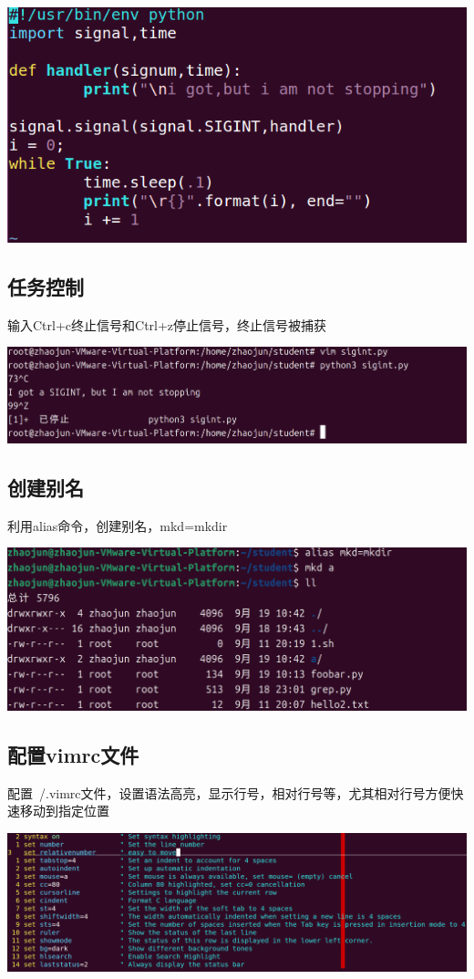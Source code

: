 \documentclass[UTF8,a4paper]{ctexart}
\begin{document}
\begin{sloppypar}
	
	\includegraphics[width = 16cm]{1}
	
	\subsection{任务控制}
	输入Ctrl+c终止信号和Ctrl+z停止信号，终止信号被捕获
	
	\includegraphics[width = 16cm]{2}
	
	\subsection{创建别名}
	利用alias命令，创建别名，mkd=mkdir
	
	\includegraphics[width = 16cm]{3}
	
	\subsection{配置vimrc文件}
	配置~/.vimrc文件，设置语法高亮，显示行号，相对行号等，尤其相对行号方便快速移动到指定位置
	
	\includegraphics[width = 16cm]{4}
	

\end{sloppypar}
\end{document}
